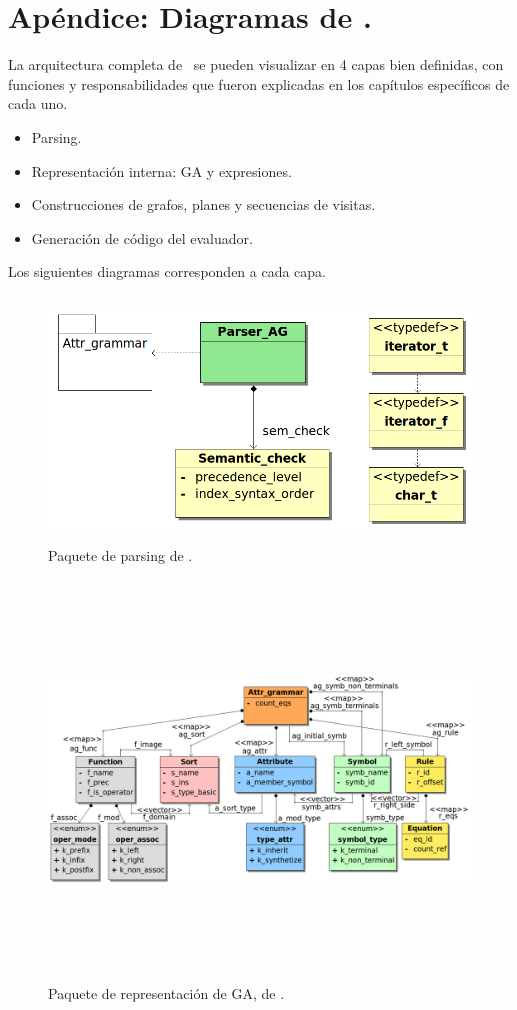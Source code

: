 \chapter{Apéndice: Diagramas de \maggen.}
\label{append:disemaggen}
La arquitectura completa de \maggen\ se pueden visualizar en 4 capas bien definidas, con funciones y responsabilidades que fueron explicadas en los capítulos específicos de cada uno.

\begin{itemize}
\item Parsing.
\item Representación interna: GA y expresiones.
\item Construcciones de grafos, planes y secuencias de visitas.
\item Generación de código del evaluador.
\end{itemize}

Los siguientes diagramas corresponden a cada capa.

\begin{figure}[!ht]\centering
\includegraphics[width=350pt, height=184pt]{diagramas/Parser.png}
\caption{\label{fig:dia-parser}Paquete de parsing de \maggen.}
\end{figure}

\begin{figure}[!ht]\centering
\includegraphics[width=605pt, height=300pt, angle=90]{diagramas/Attr_grammar.png}
\caption{\label{fig:dia-grammar}Paquete de representación de GA, de \maggen.}
\end{figure}

